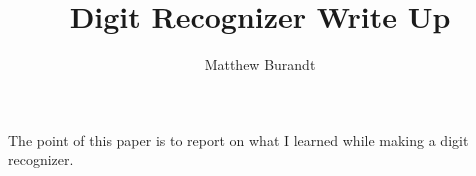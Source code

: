 \documentclass [12pt]{article}
\begin{document}
\title{Digit Recognizer Write Up}
\author{Matthew Burandt}

The point of this paper is to report on what I learned while making a digit recognizer.
\end{document}
